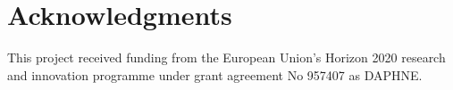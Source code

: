 \documentclass[sigconf,natbib=false]{acmart}
\begin{document}
\section*{Acknowledgments}

This project received funding from the European Union’s Horizon 2020 research and innovation programme under grant agreement No 957407 as DAPHNE.


%
%
\printbibliography
\end{document}
